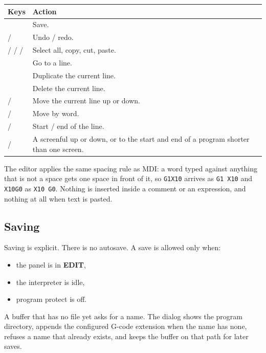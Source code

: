 \begin{longtable}{L{4.7cm}L{8.1cm}}
  \toprule
  \textbf{Keys} & \textbf{Action} \\
  \midrule
  \endhead
   & Save. \\
   /  & Undo / redo. \\
   /  /  /  & Select all, copy, cut,
        paste. \\
   & Go to a line. \\
   & Duplicate the current line. \\
   & Delete the current line. \\
   /  & Move the current line up or down. \\
   /  & Move by word. \\
   /  & Start / end of the line. \\
   /  & A screenful up or down, or to the start and end of a
        program shorter than one screen. \\
  \bottomrule
\end{longtable}

The editor applies the same spacing rule as MDI: a word typed against anything that is not a
space gets one space in front of it, so \texttt{G1X10} arrives as \texttt{G1 X10} and
\texttt{X10G0} as \texttt{X10 G0}. Nothing is inserted inside a comment or an expression, and
nothing at all when text is pasted.

\subsection*{Saving}

Saving is explicit. There is no autosave. A save is allowed only when:

\begin{itemize}
  \item the panel is in \textbf{EDIT},
  \item the interpreter is idle,
  \item program protect is off.
\end{itemize}

A buffer that has no file yet asks for a name. The dialog shows the program directory, appends
the configured G-code extension when the name has none, refuses a name that already exists, and
keeps the buffer on that path for later saves.

